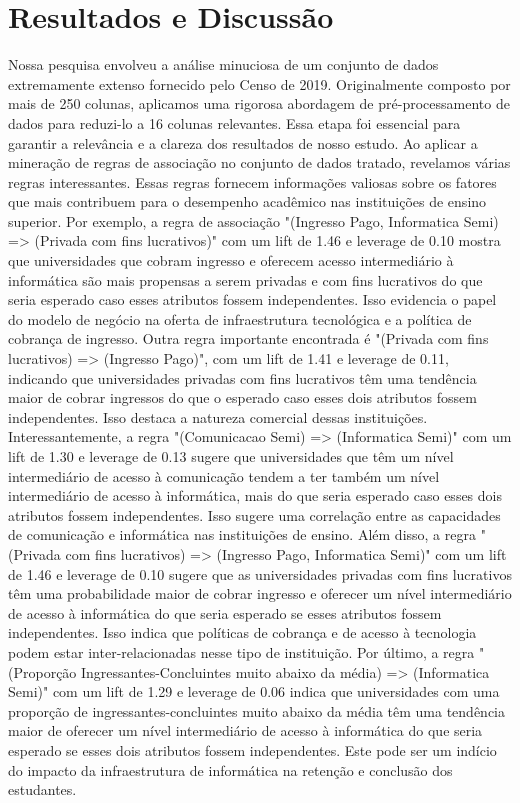 \documentclass[conference]{IEEEtran}
\begin{document}
\section{Resultados e Discussão}
Nossa pesquisa envolveu a análise minuciosa de um conjunto de dados extremamente extenso fornecido pelo Censo de 2019. Originalmente composto por mais de 250 colunas, aplicamos uma rigorosa abordagem de pré-processamento de dados para reduzi-lo a 16 colunas relevantes. Essa etapa foi essencial para garantir a relevância e a clareza dos resultados de nosso estudo.
Ao aplicar a mineração de regras de associação no conjunto de dados tratado, revelamos várias regras interessantes. Essas regras fornecem informações valiosas sobre os fatores que mais contribuem para o desempenho acadêmico nas instituições de ensino superior.
Por exemplo, a regra de associação "(Ingresso Pago, Informatica Semi) => (Privada com fins lucrativos)" com um lift de 1.46 e leverage de 0.10 mostra que universidades que cobram ingresso e oferecem acesso intermediário à informática são mais propensas a serem privadas e com fins lucrativos do que seria esperado caso esses atributos fossem independentes. Isso evidencia o papel do modelo de negócio na oferta de infraestrutura tecnológica e a política de cobrança de ingresso.
Outra regra importante encontrada é "(Privada com fins lucrativos) => (Ingresso Pago)", com um lift de 1.41 e leverage de 0.11, indicando que universidades privadas com fins lucrativos têm uma tendência maior de cobrar ingressos do que o esperado caso esses dois atributos fossem independentes. Isso destaca a natureza comercial dessas instituições.
Interessantemente, a regra "(Comunicacao Semi) => (Informatica Semi)" com um lift de 1.30 e leverage de 0.13 sugere que universidades que têm um nível intermediário de acesso à comunicação tendem a ter também um nível intermediário de acesso à informática, mais do que seria esperado caso esses dois atributos fossem independentes. Isso sugere uma correlação entre as capacidades de comunicação e informática nas instituições de ensino.
Além disso, a regra "(Privada com fins lucrativos) => (Ingresso Pago, Informatica Semi)" com um lift de 1.46 e leverage de 0.10 sugere que as universidades privadas com fins lucrativos têm uma probabilidade maior de cobrar ingresso e oferecer um nível intermediário de acesso à informática do que seria esperado se esses atributos fossem independentes. Isso indica que políticas de cobrança e de acesso à tecnologia podem estar inter-relacionadas nesse tipo de instituição.
Por último, a regra "(Proporção Ingressantes-Concluintes muito abaixo da média) => (Informatica Semi)" com um lift de 1.29 e leverage de 0.06 indica que universidades com uma proporção de ingressantes-concluintes muito abaixo da média têm uma tendência maior de oferecer um nível intermediário de acesso à informática do que seria esperado se esses dois atributos fossem independentes. Este pode ser um indício do impacto da infraestrutura de informática na retenção e conclusão dos estudantes.
\end{document}
